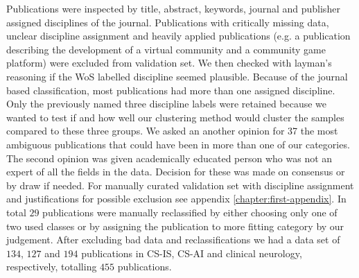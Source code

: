 Publications were inspected by title, abstract, keywords, journal
and publisher assigned disciplines of the journal. Publications
with critically missing data, unclear discipline assignment and
heavily applied publications (e.g. a publication describing the 
development of a virtual community and a community game platform)
were excluded from validation set. 
We then checked with layman's reasoning if the WoS labelled 
discipline seemed plausible. Because of the journal based 
classification, most publications had more than one assigned 
discipline. Only the previously named three discipline labels were 
retained because we wanted to test if and how well our clustering 
method would cluster the samples compared to these three 
groups. We asked an another opinion for 37 the most ambiguous 
publications that could have been in more than one of our 
categories. The second opinion was given academically educated 
person who was not an expert of all the fields in the data. 
Decision for these was made on consensus or by draw if needed.
For manually curated
validation set with discipline assignment and justifications for
possible exclusion see appendix \ref{chapter:first-appendix}.
In total $29$ publications were manually reclassified by either
choosing only one of two used classes or by assigning the 
publication to more fitting category by our judgement. After
excluding bad data and reclassifications we had a data set of 
$134$, $127$ and $194$ publications in CS-IS, CS-AI and clinical
neurology, respectively, totalling $455$ publications.

